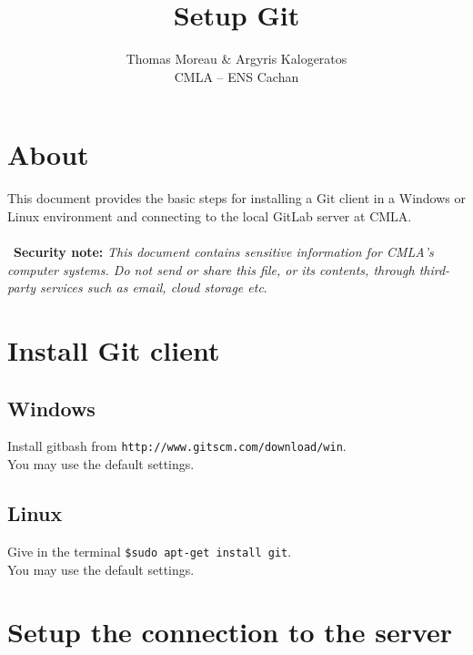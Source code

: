 \documentclass[11pt]{article}
\title{\textbf{Setup Git}}
\author{Thomas Moreau \& Argyris Kalogeratos \\
CMLA -- ENS Cachan}
\date{}
\begin{document}
\maketitle

\section{About}
This document provides the basic steps for installing a Git client in a Windows or 
Linux environment and connecting to the local GitLab server at CMLA.
\\
\\
\noindent\bell\ \textbf{Security note:} \emph{This document contains sensitive 
information for CMLA's computer systems. Do not send or share this file, 
or its contents, through third-party services such as email, cloud storage etc}. 

\section{Install Git client}

\subsection{Windows}
\label{sub:win}
\hspace{1em} Install gitbash from \texttt{http://www.git­scm.com/download/win}.\\
You may use the default settings.
\subsection{Linux}
\label{sub:linux}
	\hspace{1em} Give in the terminal \texttt{\$sudo apt-get install git}.\\
	\hspace{1em} You may use the default settings.

\section{Setup the connection to the server}
\label{sec:conn}
\end{document}
